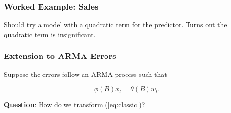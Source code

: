 \documentclass[%
xcolor=pdftex]{beamer}
\begin{document}
\begin{frame}[fragile]
\frametitle{Worked Example: Sales}

Should try a model with a quadratic term for the predictor. Turns out the quadratic term is insignificant.



\end{frame}

\begin{frame}
\frametitle{Extension to ARMA Errors}

Suppose the errors follow an ARMA process such that

$$
\phi(B) x_t = \theta(B)w_t.
$$



\textbf{Question}: How do we transform (\ref{eq:classic})?

\end{frame}
\end{document}
